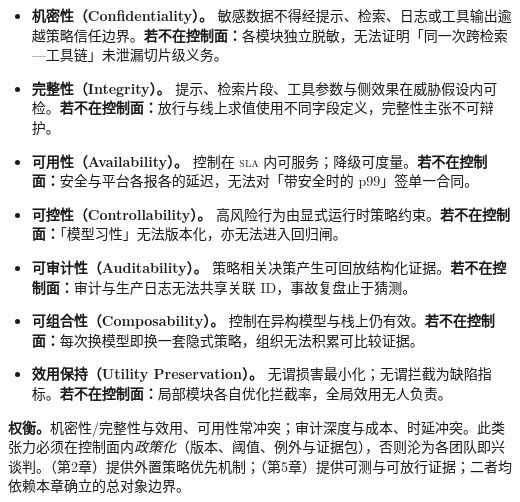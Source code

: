 \documentclass[11pt,a4paper]{report}
\begin{document}
\begin{securityobjectives}
\begin{itemize}
  \item \textbf{机密性（Confidentiality）。} 敏感数据不得经提示、检索、日志或工具输出逾越策略信任边界。\textbf{若不在控制面：}各模块独立脱敏，无法证明「同一次跨检索—工具链」未泄漏切片级义务。
  \item \textbf{完整性（Integrity）。} 提示、检索片段、工具参数与侧效果在威胁假设内可检。\textbf{若不在控制面：}放行与线上求值使用不同字段定义，完整性主张不可辩护。
  \item \textbf{可用性（Availability）。} 控制在 \textsc{sla} 内可服务；降级可度量。\textbf{若不在控制面：}安全与平台各报各的延迟，无法对「带安全时的 p99」签单一合同。
  \item \textbf{可控性（Controllability）。} 高风险行为由显式运行时策略约束。\textbf{若不在控制面：}「模型习性」无法版本化，亦无法进入回归闸。
  \item \textbf{可审计性（Auditability）。} 策略相关决策产生可回放结构化证据。\textbf{若不在控制面：}审计与生产日志无法共享关联 ID，事故复盘止于猜测。
  \item \textbf{可组合性（Composability）。} 控制在异构模型与栈上仍有效。\textbf{若不在控制面：}每次换模型即换一套隐式策略，组织无法积累可比较证据。
  \item \textbf{效用保持（Utility Preservation）。} 无谓损害最小化；无谓拦截为缺陷指标。\textbf{若不在控制面：}局部模块各自优化拦截率，全局效用无人负责。
\end{itemize}
\end{securityobjectives}

\noindent\textbf{权衡。}机密性/完整性与效用、可用性常冲突；审计深度与成本、时延冲突。此类张力必须在控制面内\emph{政策化}（版本、阈值、例外与证据包），否则沦为各团队即兴谈判。\DecoupledSafety{}（第2章）提供外置策略优先机制；\EvalFramework{}（第5章）提供可测与可放行证据；二者均依赖本章确立的总对象边界。


\end{document}
